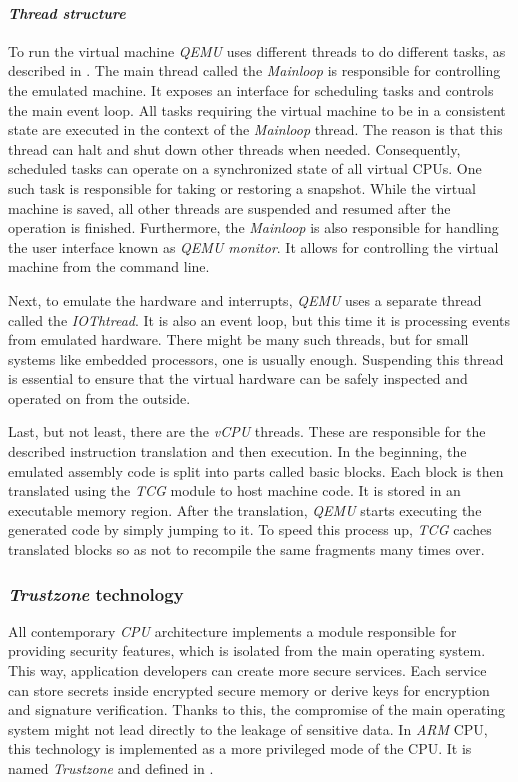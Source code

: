 \paragraph{\textit{Thread structure}}
To run the virtual machine \textit{QEMU} uses different threads to do different tasks, as described in \cite{qemuthreads}. The main thread called the \textit{Mainloop} is responsible for controlling the emulated machine. It exposes an interface for scheduling tasks and controls the main event loop. All tasks requiring the virtual machine to be in a consistent state are executed in the context of the \textit{Mainloop} thread. The reason is that this thread can halt and shut down other threads when needed. Consequently, scheduled tasks can operate on a synchronized state of all virtual CPUs. One such task is responsible for taking or restoring a snapshot. While the virtual machine is saved, all other threads are suspended and resumed after the operation is finished. Furthermore, the \textit{Mainloop} is also responsible for handling the user interface known as \textit{QEMU monitor}. It allows for controlling the virtual machine from the command line.

Next, to emulate the hardware and interrupts, \textit{QEMU} uses a separate thread called the \textit{IOThtread}. It is also an event loop, but this time it is processing events from emulated hardware. There might be many such threads, but for small systems like embedded processors, one is usually enough. Suspending this thread is essential to ensure that the virtual hardware can be safely inspected and operated on from the outside.

Last, but not least, there are the \textit{vCPU} threads. These are responsible for the described instruction translation and then execution. In the beginning, the emulated assembly code is split into parts called basic blocks. Each block is then translated using the \textit{TCG} module to host machine code. It is stored in an executable memory region. After the translation, \textit{QEMU} starts executing the generated code by simply jumping to it. To speed this process up, \textit{TCG} caches translated blocks so as not to recompile the same fragments many times over. 



\subsubsection{\textit{Trustzone} technology} \label{sec:tz}
All contemporary \textit{CPU} architecture implements a module responsible for providing security features, which is isolated from the main operating system. This way, application developers can create more secure services. Each service can store secrets inside encrypted secure memory or derive keys for encryption and signature verification. Thanks to this, the compromise of the main operating system might not lead directly to the leakage of sensitive data. In \textit{ARM} CPU, this technology is implemented as a more privileged mode of the CPU. It is named \textit{Trustzone} and defined in \cite{trustzonedoc}.

